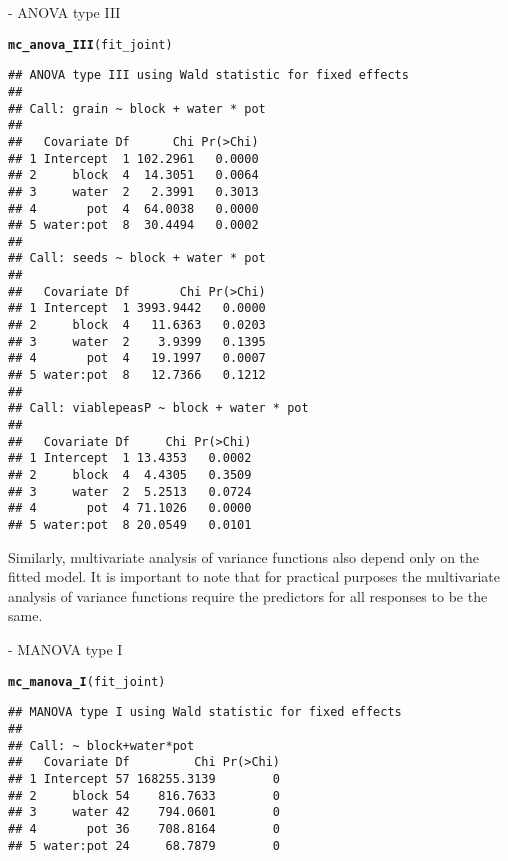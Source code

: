 \documentclass[article]{jss}\usepackage[]{graphicx}\usepackage[]{xcolor}
\makeatletter
\newcommand{\hlstd}[1]{\textcolor[rgb]{0.345,0.345,0.345}{#1}}%
\newcommand{\hlkwd}[1]{\textcolor[rgb]{0.737,0.353,0.396}{\textbf{#1}}}%
\newenvironment{kframe}{%
 \def\at@end@of@kframe{}%
 \ifinner\ifhmode%
  \def\at@end@of@kframe{\end{minipage}}%
  \begin{minipage}{\columnwidth}%
 \fi\fi%
 \def\FrameCommand##1{\hskip\@totalleftmargin \hskip-\fboxsep
 \colorbox{shadecolor}{##1}\hskip-\fboxsep
     \hskip-\linewidth \hskip-\@totalleftmargin \hskip\columnwidth}%
 \MakeFramed {\advance\hsize-\width
   \@totalleftmargin\z@ \linewidth\hsize
   \@setminipage}}%
 {\par\unskip\endMakeFramed%
 \at@end@of@kframe}
\newenvironment{knitrout}{}{} %
\makeatother
\begin{document}
 - ANOVA type III

\begin{knitrout}
\color{fgcolor}\begin{kframe}
\begin{alltt}
\hlkwd{mc_anova_III}\hlstd{(fit_joint)}
\end{alltt}
\begin{verbatim}
## ANOVA type III using Wald statistic for fixed effects
## 
## Call: grain ~ block + water * pot
## 
##   Covariate Df      Chi Pr(>Chi)
## 1 Intercept  1 102.2961   0.0000
## 2     block  4  14.3051   0.0064
## 3     water  2   2.3991   0.3013
## 4       pot  4  64.0038   0.0000
## 5 water:pot  8  30.4494   0.0002
## 
## Call: seeds ~ block + water * pot
## 
##   Covariate Df       Chi Pr(>Chi)
## 1 Intercept  1 3993.9442   0.0000
## 2     block  4   11.6363   0.0203
## 3     water  2    3.9399   0.1395
## 4       pot  4   19.1997   0.0007
## 5 water:pot  8   12.7366   0.1212
## 
## Call: viablepeasP ~ block + water * pot
## 
##   Covariate Df     Chi Pr(>Chi)
## 1 Intercept  1 13.4353   0.0002
## 2     block  4  4.4305   0.3509
## 3     water  2  5.2513   0.0724
## 4       pot  4 71.1026   0.0000
## 5 water:pot  8 20.0549   0.0101
\end{verbatim}
\end{kframe}
\end{knitrout}

Similarly, multivariate analysis of variance functions also depend only on the fitted model. It is important to note that for practical purposes the multivariate analysis of variance functions require the predictors for all responses to be the same.

 - MANOVA type I

\begin{knitrout}
\color{fgcolor}\begin{kframe}
\begin{alltt}
\hlkwd{mc_manova_I}\hlstd{(fit_joint)}
\end{alltt}
\begin{verbatim}
## MANOVA type I using Wald statistic for fixed effects
## 
## Call: ~ block+water*pot
##   Covariate Df         Chi Pr(>Chi)
## 1 Intercept 57 168255.3139        0
## 2     block 54    816.7633        0
## 3     water 42    794.0601        0
## 4       pot 36    708.8164        0
## 5 water:pot 24     68.7879        0
\end{verbatim}
\end{kframe}
\end{knitrout}
\end{document}
